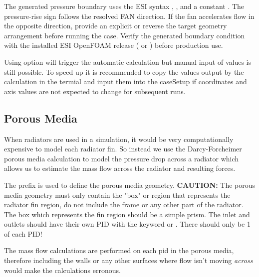 The generated pressure boundary uses the ESI syntax , , and a constant . The pressure-rise sign follows the resolved FAN direction. If the fan accelerates flow in the opposite direction, provide an explicit  or reverse the target geometry arrangement before running the case. Verify the generated boundary condition with the installed ESI OpenFOAM release ( or ) before production use.

Using  option will trigger the automatic calculation but manual input of values is still possible. To speed up  it is recommended to copy the values output by the calculation in the termial and input them into the caseSetup if coordinates and axis values are not expected to change for subsequent runs.


\subsection{Porous Media}
When radiators are used in a simulation, it would be very computationally expensive to model each radiator fin. So instead we use the Darcy-Forcheimer porous media calculation to model the pressure drop across a radiator which allows us to estimate the mass flow across the radiator and resulting forces.

The prefix  is used to define the porous media geometry. \textbf{CAUTION:} The porous media geometry must only contain the "box" or region that represents the radiator fin region, do not include the frame or any other part of the radiator. The box which represents the fin region should be a simple prism. The inlet and outlets should have their own PID with the keyword  or . There should only be 1 of each PID!

The mass flow calculations are performed on each pid in the porous media, therefore including the walls or any other surfaces where flow isn't moving \textit{across} would make the calculations erronous.

